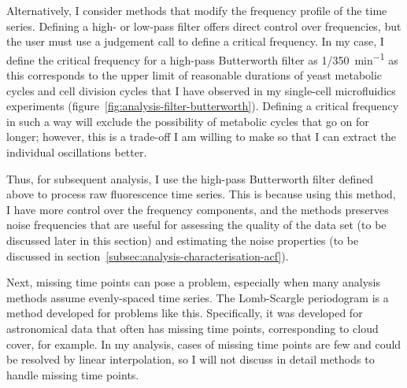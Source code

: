 Alternatively, I consider methods that modify the frequency profile of the time series.
Defining a high- or low-pass filter offers direct control over frequencies, but the user must use a judgement call to define a critical frequency.
In my case, I define the critical frequency for a high-pass Butterworth filter as \SI[parse-numbers=false]{1/350}{\minute^{-1}} as this corresponds to the upper limit of reasonable durations of yeast metabolic cycles and cell division cycles that I have observed in my single-cell microfluidics experiments (figure~\ref{fig:analysis-filter-butterworth}).
Defining a critical frequency in such a way will exclude the possibility of metabolic cycles that go on for longer; however, this is a trade-off I am willing to make so that I can extract the individual oscillations better.

Thus, for subsequent analysis, I use the high-pass Butterworth filter defined above to process raw fluorescence time series.
This is because using this method, I have more control over the frequency components, and the methods preserves noise frequencies that are useful for assessing the quality of the data set (to be discussed later in this section) and estimating the noise properties (to be discussed in section~\ref{subsec:analysis-characterisation-acf}).

Next, missing time points can pose a problem, especially when many analysis methods assume evenly-spaced time series. %
The Lomb-Scargle periodogram \parencite{lombLeastsquaresFrequencyAnalysis1976} is a method developed for problems like this.
Specifically, it was developed for astronomical data that often has missing time points, corresponding to cloud cover, for example.
In my analysis, cases of missing time points are few and could be resolved by linear interpolation, so I will not discuss in detail methods to handle missing time points.

